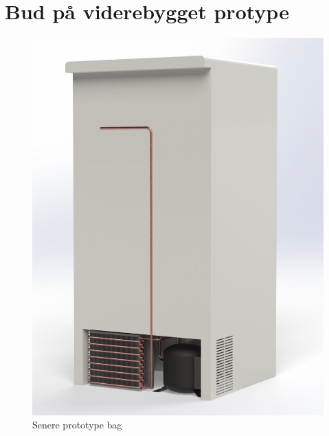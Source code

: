 \documentclass[Hovedrapport.tex]{subfiles}
\begin{document}
\section{Bud på viderebygget protype}
\label{sec:proto2}
\begin{figure}[H]
    \centering
    \includegraphics[width=1.0\textwidth]{Billeder/proto2}
    \caption{Senere prototype bag}
    \label{fig:proto2}
\end{figure}
\end{document}

